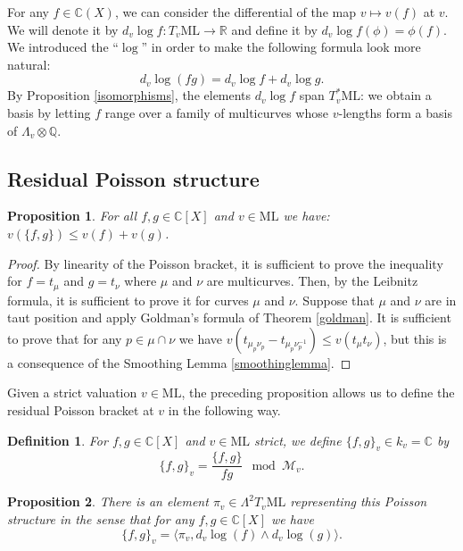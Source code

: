 \documentclass{amsart}
\newtheorem{definition}{Definition}
\newtheorem{proposition}{Proposition}
\newcommand{\C}{\mathbb{C}}
\newcommand{\R}{\mathbb{R}}
\newcommand{\Q}{\mathbb{Q}}
\newcommand{\ML}{\mathrm{ML}}
\newcommand{\Mm}{\mathcal{M}}
\DeclareMathOperator{\ratrk}{\mathrm{rat.rk}}
\begin{document}

For any $f\in \C(X)$, we can consider the differential of the map $v\mapsto v(f)$ at $v$. We will denote it by $d_v\log f:T_v \ML\to \R$ and define it by $d_v\log f(\phi)=\phi(f)$. We introduced the ``$\log$'' in order to make the following formula look more natural:
$$d_v\log (fg)=d_v\log f +d_v\log g.$$
By Proposition \ref{isomorphisms}, the elements $d_v\log f$ span $T_v^*\ML$: we obtain a basis by letting $f$ range over a family of multicurves whose $v$-lengths form a basis of $\Lambda_v\otimes \Q$. 

\subsection{Residual Poisson structure}

\begin{proposition}\label{inegalitecrochet}
For all $f,g\in \C[X]$ and $v\in \ML$ we have: $v(\{f,g\})\le v(f)+v(g)$.
\end{proposition}
\begin{proof}
By linearity of the Poisson bracket, it is sufficient to prove the inequality for $f=t_\mu$ and $g=t_\nu$ where $\mu$ and $\nu$ are multicurves. Then, by the Leibnitz formula, it is sufficient to prove it for curves $\mu$ and $\nu$. Suppose that $\mu$ and $\nu$ are in taut position and apply Goldman's formula of Theorem \ref{goldman}. It is sufficient to prove that for any $p\in \mu\cap\nu$ we have $v(t_{\mu_p\nu_p}-t_{\mu_p\nu_p^{-1}})\le v(t_\mu t_\nu)$, but this is a consequence of the Smoothing Lemma \ref{smoothinglemma}. 
\end{proof}

Given a strict valuation $v\in \ML$, the preceding proposition allows us to define the residual Poisson bracket at $v$ in the following way. 

\begin{definition}
For $f,g\in \C[X]$ and $v\in \ML$ strict, we define $\{f,g\}_v\in k_v = \C$ by $$\{f,g\}_v=\frac{\{f,g\}}{fg} \mod \Mm_v.$$
\end{definition}

\begin{proposition}
There is an element $\pi_v\in \Lambda^2 T_v\ML$ representing this Poisson structure in the sense that for any $f,g\in \C[X]$ we have 
$$\{f,g\}_v=\langle \pi_v, d_v \log(f)\wedge d_v\log(g)\rangle.$$
\end{proposition}
\end{document}
